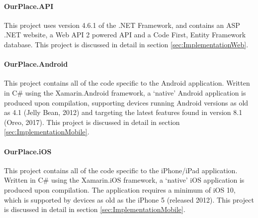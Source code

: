 \paragraph{OurPlace.API}
This project uses version 4.6.1 of the .NET Framework, and contains an ASP .NET
website, a Web API 2 powered API and a Code First, Entity Framework database.
This project is discussed in detail in section \ref{sec:ImplementationWeb}.

\paragraph{OurPlace.Android}
This project contains all of the code specific to the Android application.
Written in C\# using the Xamarin.Android framework, a `native' Android application is
produced upon compilation, supporting devices running Android versions as old as
4.1 (Jelly Bean, 2012) and targeting the latest features found in version 8.1
(Oreo, 2017). This project is discussed in detail in section
\ref{sec:ImplementationMobile}.

\paragraph{OurPlace.iOS}
This project contains all of the code specific to the iPhone/iPad application.
Written in C\# using the Xamarin.iOS framework, a `native' iOS application is
produced upon compilation. The application requires a minimum of iOS 10, which
is supported by devices as old as the iPhone 5 (released 2012). This project is
discussed in detail in section \ref{sec:ImplementationMobile}.